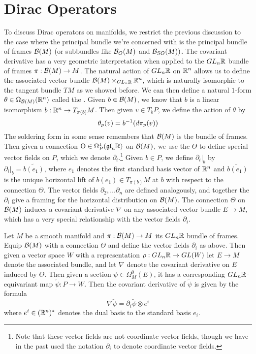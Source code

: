 %
\section{Dirac Operators}
%
To discuss Dirac operators on manifolds, we restrict the previous discussion
to the case where the principal bundle we're concerned with is the principal
bundle of frames $\mathcal{B}(M)$ (or subbundles like $\mathcal{B}_O(M)$ and $\mathcal{B}_{SO}(M))$.
The covariant derivative has a very geometric interpretation
when applied to the $GL_n\mathbb{R}$ bundle of frames $\pi : \mathcal{B}(M) \to M$.
The natural action of $GL_n\mathbb{R}$ on $\mathbb{R}^n$ allows us to
define the associated vector bundle $\mathcal{B}(M) \times_{GL_n\mathbb{R}} \mathbb{R}^n$, which is
naturally isomorphic to the tangent bundle $TM$ as we showed before. We can then
define a natural $1$-form $\theta \in \Omega_{\mathcal{B}(M)}(\mathbb{R}^n)$ called the
. Given $b \in \mathcal{B}(M)$, we know that $b$ is a linear
isomorphism $b : \mathbb{R}^n \to T_{\pi(b)}M$. Then given $v \in T_bP$, we
define the action of $\theta$ by
\[
 \theta_p(v) = b^{-1}(d\pi_p(v))
\]
The soldering form in some sense remembers that $\mathcal{B}(M)$ is the bundle of
frames. Then given a connection $\Theta \in \Omega_P^1(\mathfrak{gl}_n\mathbb{R})$ on $\mathcal{B}(M)$,
we use the $\Theta$ to define special vector fields on $P$, which we
denote $\partial_i$.\footnote{Note that these vector fields are not coordinate
 vector fields, though we have in the past used the notation $\partial_i$ to
 denote coordinate vector fields.} Given $b \in P$, we define $\partial_i\vert_b$
by $\partial_i\vert_b = \widetilde{b(e_1)}$, where $e_1$ denotes the first
standard basis vector of $\mathbb{R}^n$ and $\widetilde{b(e_1)}$ is the unique horizontal
lift of $b(e_1) \in T_{\pi(b)}M$ at $b$ with respect to the connection $\Theta$.
The vector fields $\partial_2, \ldots \partial_n$ are defined analogously,
and together the $\partial_i$ give a framing for the horizontal distribution on
$\mathcal{B}(M)$. The connection $\Theta$ on $\mathcal{B}(M)$ induces a covariant derivative $\nabla$
on any associated vector bundle $E \to M$, which has a very special relationship
with the vector fields $\partial_i$.
%
\begin{prop}
 Let $M$ be a smooth manifold and $\pi : \mathcal{B}(M) \to M$ its $GL_n\mathbb{R}$ bundle
 of frames. Equip $\mathcal{B}(M)$ with a connection $\Theta$ and define the vector fields
 $\partial_i$ as above. Then given a vector space $W$ with a representation
 $\rho : GL_n\mathbb{R} \to GL(W)$ let $E \to M$ denote the associated bundle, and
 let $\nabla$ denote the covariant derivative on $E$ induced by $\Theta$. Then
 given a section $\psi \in \Omega_M^0(E)$, it has a corresponding
 $GL_n\mathbb{R}$-equivariant map $\tilde{\psi} : P \to W$. Then the covariant derivative
 of $\tilde{\psi}$ is given by the formula
 \[
  \nabla\tilde{\psi} = \partial_i\tilde{\psi} \otimes e^i
 \]
 where $e^i \in (\mathbb{R}^n)^*$ denotes the dual basis to the standard basis $e_i$.
\end{prop}

